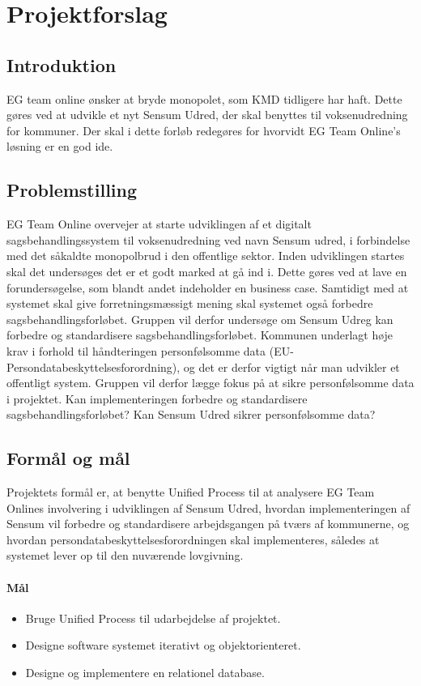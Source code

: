 \documentclass[../main.tex]{subfiles}
\begin{document}
\section{Projektforslag}
\subsection{Introduktion}
EG team online ønsker at bryde monopolet, som KMD tidligere har haft.
Dette gøres ved at udvikle et nyt Sensum Udred, der skal benyttes til voksenudredning for kommuner.
Der skal i dette forløb redegøres for hvorvidt EG Team Online’s løsning er en god ide.

\subsection{Problemstilling}
EG Team Online overvejer at starte udviklingen af et digitalt sagsbehandlingssystem
til voksenudredning ved navn Sensum udred, i forbindelse med det såkaldte
monopolbrud i den offentlige sektor. Inden udviklingen startes skal det undersøges
det er et godt marked at gå ind i. Dette gøres ved at lave en forundersøgelse, som
blandt andet indeholder en business case. Samtidigt med at systemet skal give
forretningsmæssigt mening skal systemet også forbedre sagsbehandlingsforløbet.
Gruppen vil derfor undersøge om Sensum Udreg kan forbedre og standardisere
sagsbehandlingsforløbet.
Kommunen underlagt høje krav i forhold til håndteringen personfølsomme
data (EU-Persondatabeskyttelsesforordning), og det er derfor vigtigt når man
udvikler et offentligt system. Gruppen vil derfor lægge fokus på at sikre
personfølsomme data i projektet. Kan implementeringen forbedre og standardisere
sagsbehandlingsforløbet? Kan Sensum Udred sikrer personfølsomme data?

\subsection{Formål og mål}
Projektets formål er, at benytte Unified Process til at analysere EG Team Onlines
involvering i udviklingen af Sensum Udred, hvordan implementeringen af
Sensum vil forbedre og standardisere arbejdsgangen på tværs af kommunerne, og
hvordan persondatabeskyttelsesforordningen skal implementeres, således at systemet
lever op til den nuværende lovgivning.

\paragraph{Mål}
\begin{itemize}
  \item Bruge Unified Process til udarbejdelse af projektet.
  \item Designe software systemet iterativt og objektorienteret.
  \item Designe og implementere en relationel database.
\end{itemize}
\end{document}
